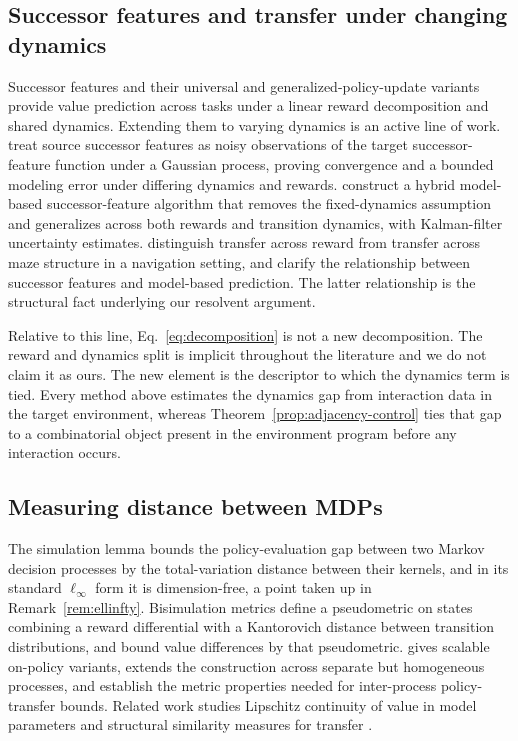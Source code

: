 \documentclass[twoside]{article}
\begin{document}
\subsection{Successor features and transfer under changing dynamics}

Successor features \citep{barreto2017successor, barreto2018transfer} and their universal \citep{borsa2019universal} and generalized-policy-update \citep{barreto2020fast} variants provide value prediction across tasks under a linear reward decomposition and shared dynamics. Extending them to varying dynamics is an active line of work. \citet{abdolshah2021new} treat source successor features as noisy observations of the target successor-feature function under a Gaussian process, proving convergence and a bounded modeling error under differing dynamics and rewards. \citet{malekzadeh2023uncertainty} construct a hybrid model-based successor-feature algorithm that removes the fixed-dynamics assumption and generalizes across both rewards and transition dynamics, with Kalman-filter uncertainty estimates. \citet{zhang2017deep} distinguish transfer across reward from transfer across maze structure in a navigation setting, and \citet{lehnert2020successor} clarify the relationship between successor features and model-based prediction. The latter relationship is the structural fact underlying our resolvent argument.

Relative to this line, Eq.~\ref{eq:decomposition} is not a new decomposition. The reward and dynamics split is implicit throughout the literature and we do not claim it as ours. The new element is the descriptor to which the dynamics term is tied. Every method above estimates the dynamics gap from interaction data in the target environment, whereas Theorem~\ref{prop:adjacency-control} ties that gap to a combinatorial object present in the environment program before any interaction occurs.

\subsection{Measuring distance between MDPs}

The simulation lemma \citep{kearns2002near} bounds the policy-evaluation gap between two Markov decision processes by the total-variation distance between their kernels, and in its standard $\ell_\infty$ form it is dimension-free, a point taken up in Remark~\ref{rem:ellinfty}. Bisimulation metrics \citep{ferns2004metrics, ferns2011bisimulation} define a pseudometric on states combining a reward differential with a Kantorovich distance between transition distributions, and bound value differences by that pseudometric. \citet{castro2020scalable} gives scalable on-policy variants, \citet{song2016measuring} extends the construction across separate but homogeneous processes, and \citet{tao2025generalized} establish the metric properties needed for inter-process policy-transfer bounds. Related work studies Lipschitz continuity of value in model parameters \citep{hinderer2005lipschitz, rachelson2010locality, asadi2018lipschitz, pirotta2015policy} and structural similarity measures for transfer \citep{castro2010using}.
\end{document}

